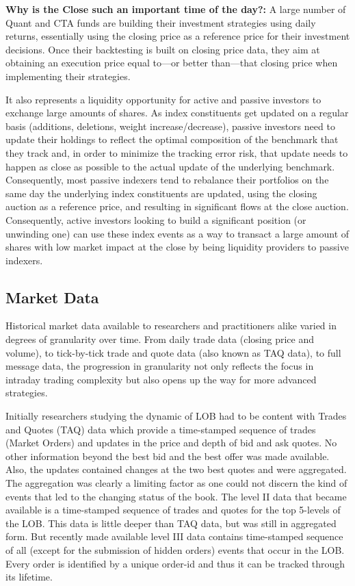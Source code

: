 \textbf{Why is the Close such an important time of the day?:}
A large number of Quant and CTA funds are building their investment strategies using daily returns, essentially using the closing price as a reference price for their investment decisions. Once their backtesting is built on closing price data, they aim at obtaining an execution price equal to---or better than---that closing price when implementing their strategies. 


It also represents a liquidity opportunity for active and passive investors to exchange large amounts of shares. As index constituents get updated on a regular basis (additions, deletions, weight increase/decrease), passive investors need to update their holdings to reflect the optimal composition of the benchmark that they track and, in order to minimize the tracking error risk, that update needs to happen as close as possible to the actual update of the underlying benchmark. Consequently, most passive indexers tend to rebalance their portfolios on the same day the underlying index constituents are updated, using the closing auction as a reference price, and resulting in significant flows at the close auction. Consequently, active investors looking to build a significant position (or unwinding one) can use these index events as a way to transact a large amount of shares with low market impact at the close by being liquidity providers to passive indexers.  



\subsection{Market Data}



Historical market data available to researchers and practitioners alike varied in degrees of granularity over time. From daily trade data (closing price and volume), to tick-by-tick trade and quote data (also known as TAQ data), to full message data, the progression in granularity not only reflects the focus in intraday trading complexity but also opens up the way for more advanced strategies. 


Initially researchers studying the dynamic of LOB had to be content with Trades and Quotes (TAQ) data which provide a time-stamped sequence of trades (Market Orders) and updates in the price and depth of bid and ask quotes. No other information beyond the best bid and the best offer was made available. Also, the updates contained changes at the two best quotes and were aggregated. The aggregation was clearly a limiting factor as one could not discern the kind of events that led to the changing status of the book. The level II data that became available is a time-stamped sequence of trades and quotes for the top 5-levels of the LOB. This data is little deeper than TAQ data, but was still in aggregated form. But recently made available level III data contains time-stamped sequence of all (except for the submission of hidden orders) events that occur in the LOB. Every order is identified by a unique order-id and thus it can be tracked through its lifetime. \\


